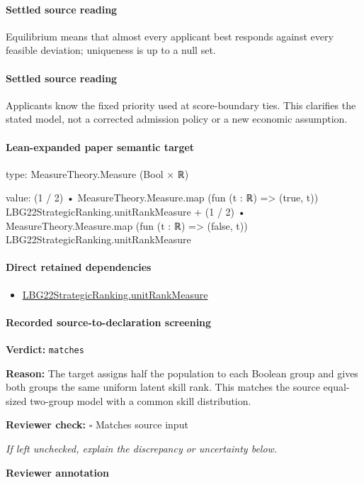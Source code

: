 \documentclass[10pt]{article}
\newcommand{\reviewerbox}{%
  \par\noindent\fbox{\parbox{0.96\linewidth}{\rule{0pt}{0.38in}}}\par
}
\newcommand{\reviewmatch}[1]{%
  \par\noindent\textbf{Reviewer check:} $\square$\; #1\par
  \noindent\emph{If left unchecked, explain the discrepancy or uncertainty below.}\par
}
\begin{document}
\paragraph{Settled source reading}
\begin{sloppypar}
Equilibrium means that almost every applicant best responds against every feasible deviation;\allowbreak{} uniqueness is up to a null set.\allowbreak{}
\end{sloppypar}
\paragraph{Settled source reading}
\begin{sloppypar}
Applicants know the fixed priority used at score-\allowbreak{}boundary ties.\allowbreak{} This clarifies the stated model, not a corrected admission policy or a new economic assumption.\allowbreak{}
\end{sloppypar}

\paragraph{Lean-expanded paper semantic target}
\begin{ReviewVerbatim}
type:
MeasureTheory.Measure (Bool × ℝ)

value:
(1 / 2) • MeasureTheory.Measure.map (fun (t : ℝ) => (true, t)) LBG22StrategicRanking.unitRankMeasure +
  (1 / 2) • MeasureTheory.Measure.map (fun (t : ℝ) => (false, t)) LBG22StrategicRanking.unitRankMeasure
\end{ReviewVerbatim}

\paragraph{Direct retained dependencies}
\begin{itemize}\raggedright
\item \hyperlink{governing-declaration-678cf48d549cb620}{LBG22\allowbreak{}Strategic\allowbreak{}Ranking.\allowbreak{}unit\allowbreak{}Rank\allowbreak{}Measure}
\end{itemize}
\paragraph{Recorded source-to-declaration screening}
\textbf{Verdict:} \texttt{matches}
\\
{\raggedright
\textbf{Reason:} The target assigns half the population to each Boolean group and gives both groups the same uniform latent skill rank.\allowbreak{} This matches the source equal-\allowbreak{}sized two-\allowbreak{}group model with a common skill distribution.\allowbreak{}
\par}
\reviewmatch{Matches source input}
\noindent\textbf{Reviewer annotation}\par
\reviewerbox
\clearpage
\hypertarget{paper-prerequisite-b8e06f39e94d0049}{}
\end{document}
